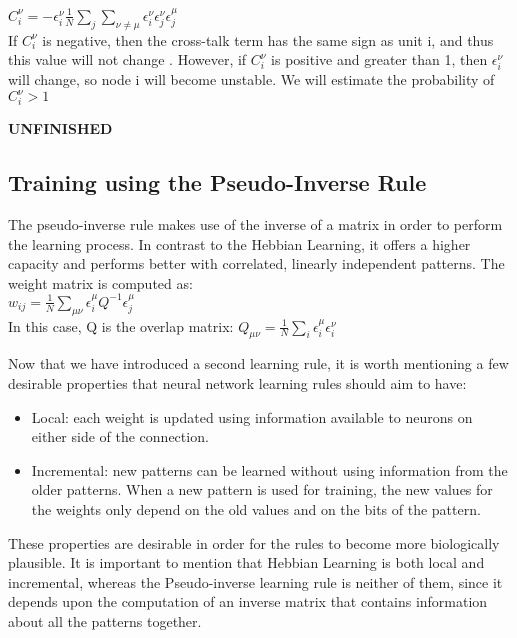  \( C_{i}^{\nu}= -\epsilon_{i}^{\nu} \frac{1}{N}\sum_{j} \sum_{\nu\neq\mu} 			 			\epsilon_{i}^{\nu}
		       		 \epsilon_{j}^{\nu}
				 \epsilon_{j}^{\mu}\)\\
 
 If \( C_{i}^{\nu} \) is negative, then the cross-talk term has the same sign as unit i, and thus this value will not change \cite{lectureslides}. However, if \( C_{i}^{\nu} \) is positive and greater than 1, then \( \epsilon_{i}^{\nu}\) will change, so node i will become unstable. We will estimate the probability of \( C_{i}^{\nu} > 1 \)
 
 \textbf{UNFINISHED}
 
\subsection{Training using the Pseudo-Inverse Rule}

The pseudo-inverse rule makes use of the inverse of a matrix in order to perform the learning process. In contrast to the Hebbian Learning, it offers a higher capacity and performs better with correlated, linearly independent patterns. The weight matrix is computed as:\\

\( w_{ij} = \frac{1}{N} \sum_{\mu\nu}\epsilon_{i}^\mu Q^{-1} \epsilon_{j}^\mu \)\\

In this case, Q is the overlap matrix:
\(  Q_{\mu\nu} = \frac{1}{N}\sum_{i}\epsilon_{i}^\mu \epsilon_{i}^\nu \)

Now that we have introduced a second learning rule, it is worth mentioning a few desirable properties that neural network learning rules should aim to have:
\begin{itemize}
 \item Local: each weight is updated using information available to neurons on either side of the connection. 
 \item Incremental: new patterns can be learned without using information from the older patterns. When a new pattern is used for training, the new values for the weights only depend on the old values and on the bits of the pattern.
\end{itemize}

These properties are desirable in order for the rules to become more biologically plausible. It is important to mention that Hebbian Learning is both local and incremental, whereas the Pseudo-inverse learning rule is neither of them, since it depends upon the computation of an inverse matrix that contains information about all the patterns together.

